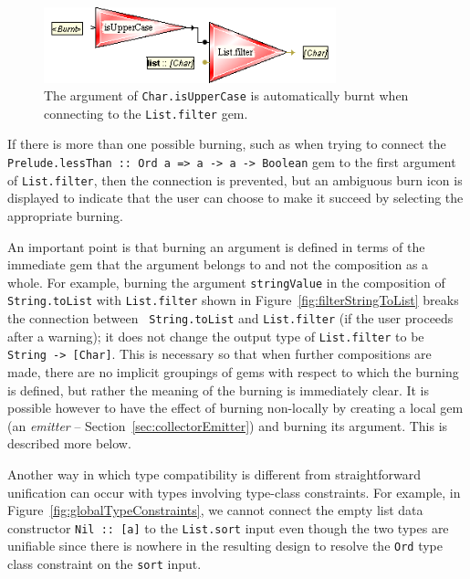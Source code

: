 \documentclass[preprint]{sigplanconf}
\begin{document}
\begin{figure}[htb]
  \centering
  \includegraphics[width=20pc]{burntConnection.png}
  \caption{The argument of {\tt Char.isUpperCase} is automatically burnt when connecting to the {\tt List.filter} gem.}
  \label{fig:burntConnection}
\end{figure}

If there is more than one possible burning, such as when trying to
connect the {\tt Prelude.lessThan :: Ord a => a -> a -> Boolean} gem
to the first argument of {\tt List.filter}, then the connection is
prevented, but an ambiguous burn icon is displayed to indicate that
the user can choose to make it succeed by selecting the appropriate
burning.

An important point is that burning an argument is defined in terms of
the immediate gem that the argument belongs to and not the composition
as a whole. For example, burning the argument {\tt stringValue} in the
composition of {\tt String.toList} with {\tt List.filter} shown in
Figure~\ref{fig:filterStringToList} breaks the connection between {\tt
String.toList} and {\tt List.filter} (if the user proceeds after a
warning); it does not change the output type of {\tt List.filter} to
be {\tt String -> [Char]}. This is necessary so that when further
compositions are made, there are no implicit groupings of gems with
respect to which the burning is defined, but rather the meaning
of the burning is immediately clear. It is possible however to have
the effect of burning non-locally by creating a local gem (an {\it emitter}
-- Section~\ref{sec:collectorEmitter}) and burning its argument. This is described
more below.

Another way in which type compatibility is different from
straightforward unification can occur with types involving type-class
constraints. For example, in Figure~\ref{fig:globalTypeConstraints}, we
cannot connect the empty list data constructor {\tt Nil :: [a]} to the
{\tt List.sort} input even though the two types are unifiable since
there is nowhere in the resulting design to resolve the {\tt Ord}
type class constraint on the {\tt sort} input.
\end{document}
